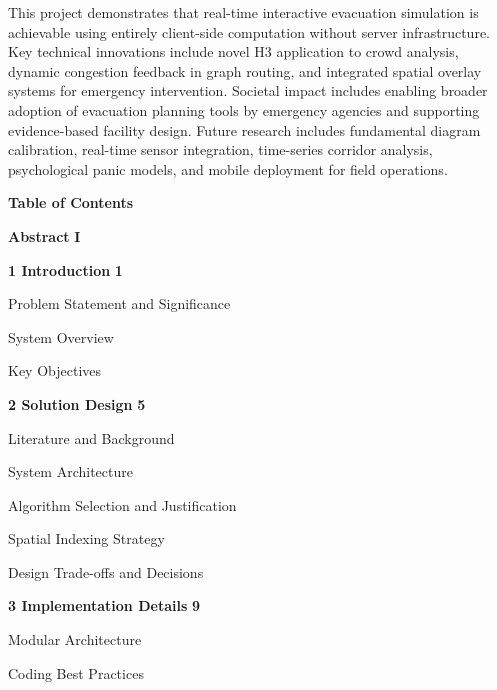 \documentclass[12pt,a4paper,oneside]{report}
\begin{document}
This project demonstrates that real-time interactive evacuation simulation is achievable using entirely client-side computation without server infrastructure. Key technical innovations include novel H3 application to crowd analysis, dynamic congestion feedback in graph routing, and integrated spatial overlay systems for emergency intervention. Societal impact includes enabling broader adoption of evacuation planning tools by emergency agencies and supporting evidence-based facility design. Future research includes fundamental diagram calibration, real-time sensor integration, time-series corridor analysis, psychological panic models, and mobile deployment for field operations.

\clearpage
\newpage
\thispagestyle{titlepage}
\begin{center}
    \vspace*{0.5cm}
    {\Huge\textbf{Table of Contents}}
\end{center}
\vspace{1.5cm}

\noindent\textbf{Abstract} \dotfill \textbf{I}

\vspace{0.4cm}
\noindent\textbf{1 \quad Introduction} \dotfill \textbf{1}

\noindent{} \quad Problem Statement and Significance 

\noindent{} \quad System Overview 

\noindent{} \quad Key Objectives 

\vspace{0.3cm}
\noindent\textbf{2 \quad Solution Design} \dotfill \textbf{5}

\noindent{} \quad Literature and Background 

\noindent{} \quad System Architecture 

\noindent{} \quad Algorithm Selection and Justification 

\noindent{} \quad Spatial Indexing Strategy 

\noindent{} \quad Design Trade-offs and Decisions 

\vspace{0.3cm}
\noindent\textbf{3 \quad Implementation Details} \dotfill \textbf{9}

\noindent{} \quad Modular Architecture 

\noindent{} \quad Coding Best Practices 
\end{document}
